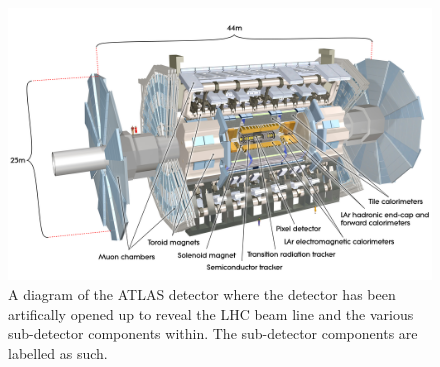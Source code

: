 \begin{figure}[ht!]
\centering
\includegraphics[width=.9\textwidth]{figures/atlas/detector.jpg}
\caption{A diagram of the ATLAS detector where the detector has
been artifically opened up to reveal the LHC beam line and the
various sub-detector components within. The sub-detector components
are labelled as such.}
\label{fig:atlas}
\end{figure}

